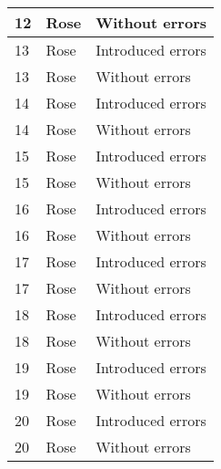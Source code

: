 \begin{table}[!ht]
\begin{center}
\begin{tabular}[center]{| l | l | l |}
         12 & Rose & Without errors \\
         \hline
         13 & Rose & Introduced errors \\
         13 & Rose & Without errors \\
         \hline
         14 & Rose & Introduced errors \\
         14 & Rose & Without errors \\
         \hline
         15 & Rose & Introduced errors \\
         15 & Rose & Without errors \\
         \hline
         16 & Rose & Introduced errors \\
         16 & Rose & Without errors \\
         \hline
         17 & Rose & Introduced errors \\
         17 & Rose & Without errors \\
         \hline
         18 & Rose & Introduced errors \\
         18 & Rose & Without errors \\
         \hline
         19 & Rose & Introduced errors \\
         19 & Rose & Without errors \\
         \hline
         20 & Rose & Introduced errors \\
         20 & Rose & Without errors \\
         \hline
      \end{tabular}
   \end{center}
\end{table}
